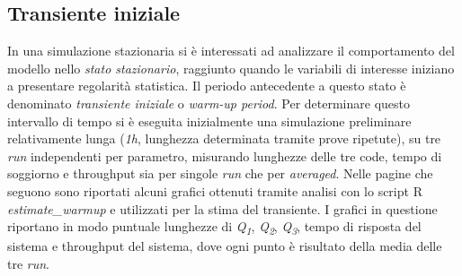 \documentclass[a4paper,11pt]{article}
\begin{document}
\subsection{Transiente iniziale}
In una simulazione stazionaria si è interessati ad analizzare il comportamento del modello nello \textit{stato stazionario}, raggiunto quando le variabili di interesse iniziano a presentare regolarità statistica. Il periodo antecedente a questo stato è denominato \textit{transiente iniziale} o \textit{warm-up period}. \newline
Per determinare questo intervallo di tempo si è eseguita inizialmente una simulazione preliminare relativamente lunga (\textit{1h}, lunghezza determinata tramite prove ripetute), su tre \textit{run} independenti per parametro, misurando lunghezze delle tre code, tempo di soggiorno e throughput sia per singole \textit{run} che per \textit{averaged}.\newline
Nelle pagine che seguono sono riportati alcuni grafici ottenuti tramite analisi con lo script R \textit{estimate\_warmup} e utilizzati per la stima del transiente.\newline
I grafici in questione riportano in modo puntuale lunghezze di \textit{Q\textsubscript{1}}, \textit{Q\textsubscript{2}}, \textit{Q\textsubscript{3}}, tempo di risposta del sistema e throughput del sistema, dove ogni punto è risultato della media delle tre \textit{run}.
\newpage
\end{document}
